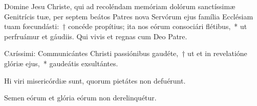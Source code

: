\documentclass[vesperale_romanum.tex]{subfiles}
\begin{document}
\bmvtone


\omniapraeter

\hymnus
\label{hy_omnis_expertem_solesmes_1961}
{}



\myrule



\duplex





\oratio

\lettrine{D}{o}mine Jesu Christe, qui ad recoléndam memóriam dolórum san\-ctíssimæ Genitrícis tuæ, per septem beátos Patres nova Servórum ejus família Ecclésiam tuam fœcundásti:~† concéde propítius; ita nos eórum consociári flétibus,~* ut perfruámur et gáudiis. Qui vivis et regnas cum Deo Patre.

\quadcommferiae



\lettrine{C}{a}ríssimi: Communicántes Christi passiónibus gaudéte,~† ut et in revelatióne glóriæ ejus,~* gaudeátis exsultántes.

\hymnus


\vv Hi viri misericórdiæ sunt, quorum pietátes non defuérunt.

\rr Semen eórum et glória eórum non derelinquétur.


\quadcommferiae

\myrule
\end{document}
